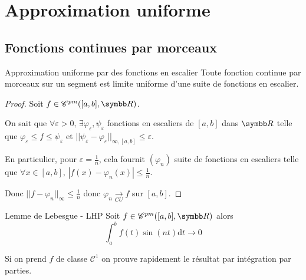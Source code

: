 
\section{Approximation uniforme}
\subsection{Fonctions continues par morceaux}

\begin{theoreme}{Approximation uniforme par des fonctions en escalier}{}
    Toute fonction continue par morceaux sur un segment est limite uniforme d'une suite 
    de fonctions en escalier. 
\end{theoreme}

\begin{proof}
    Soit $f \in \mathscr C^{pm}([a, b], \R)$. 

    On sait que $\forall \varepsilon > 0, \, \exists \varphi_\varepsilon, \psi_\varepsilon$ fonctions en escaliers 
    de $[a, b]$ dans $\R$ telle que $\varphi_\varepsilon \leqslant f \leqslant \psi_\varepsilon$ et
    $||\psi_\varepsilon - \varphi_\varepsilon||_{\infty, [a, b]} \leqslant \varepsilon$.

    En particulier, pour $\varepsilon = \frac 1 n$, cela fournit $(\varphi_n)$ suite de 
    fonctions en escaliers telle que $\forall x \in [a, b], \, | f(x) - \varphi_n(x) | \leqslant \frac 1 n$.

    Donc $||f - \varphi_n||_\infty \leqslant \frac 1 n $ donc $\varphi_n \xrightarrow[CU]{} f$ sur $[a, b]$.
\end{proof}


\begin{proposition}{Lemme de Lebesgue - LHP}{}
    Soit $f \in \mathscr C^{pm}([a, b], \R)$ alors \[\int_a^b f(t) \sin(nt) \mathrm d t \to 0\]
\end{proposition}

\begin{remarque}
    Si on prend $f$ de classe $\mathscr C^1$ on prouve rapidement le résultat par intégration par parties.
\end{remarque}


